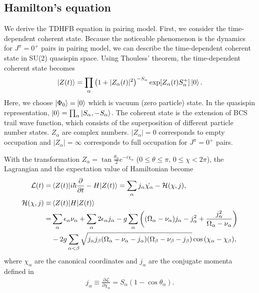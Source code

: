 \documentclass[11pt]{book} %
\begin{document}
\subsection{Hamilton's equation}
We derive the TDHFB equation in pairing model. First, we consider the time-dependent coherent state. Because the noticeable phenomenon is the dynamics for $J^{\pi}=0^+$ pairs in pairing model, we can describe the time-dependent coherent state in SU(2) quasispin space. Using Thouless' theorem, the time-dependent coherent state becomes
\begin{equation}
	\ket{Z(t)} = \prod_{\alpha} \left(1+|Z_{\alpha}(t)|^2\right)^{-S_{\alpha}}
	\exp [Z_{\alpha}(t) S_{\alpha}^{+}] \ket{0} .
 \label{coherent}
\end{equation}
Here, we choose $\ket{\Phi_0}=\ket{0}$ which is vacuum (zero particle) state. In the quasispin representation, $\ket{0}=\prod_{\alpha} \ket{S_{\alpha},-S_{\alpha}}$. The coherent state is the extension of BCS trail wave function, which consists of the superposition of different particle number states. $Z_{\alpha}$ are complex numbers. $|Z_{\alpha}|=0$ corresponds to empty occupation and $|Z_{\alpha}|=\infty$ corresponds to full occupation for $J^{\pi}=0^+$ pairs.\par
 With the transformation $Z_{\alpha} = \tan{\frac{\theta_{\alpha}}{2}}e^{-i\chi_{\alpha}}$ ($0\leq\theta\leq\pi$, $0\leq\chi<2\pi$), the Lagrangian and the expectation value of Hamiltonian become
\begin{align}
	\mathcal{L}(t) =& \braket{Z(t)|i\hbar\frac{\partial}{\partial t}-H|Z(t)}
	=\sum_{\alpha} j_{\alpha}\dot{\chi_{\alpha}} - \mathcal{H}(\chi,j) ,\\
	\mathcal{H}(\chi,j) \equiv& \braket{Z(t)|H|Z(t)} \nonumber \\
	=& \sum_{\alpha} \epsilon_{\alpha}\nu_{\alpha} + \sum_{\alpha} 2\epsilon_{\alpha}j_{\alpha} - g\sum_{\alpha} \left( (\Omega_{\alpha}-\nu_{\alpha}) j_{\alpha} - j_{\alpha}^2 +\frac{j_{\alpha}^2}{\Omega_{\alpha}-\nu_{\alpha}} \right) \nonumber \\
	&- 2g\sum_{\alpha<\beta} \sqrt{j_{\alpha}j_{\beta}(\Omega_{\alpha}-\nu_{\alpha}-j_{\alpha})(\Omega_{\beta}-\nu_{\beta}-j_{\beta})}\cos{(\chi_{\alpha}-\chi_{\beta})}   ,
	\label{Hamiltonian}
\end{align}
where $\chi_{\alpha}$ are the canonical coordinates and $j_{\alpha}$ are the conjugate momenta defined in
\begin{align}
  j_{\alpha}\equiv \frac{\partial\mathcal{L}}{\partial\dot{\chi}_{\alpha}}=S_{\alpha}(1-\cos{\theta}_{\alpha}) .
  \label{momenta}
\end{align}
\end{document}
